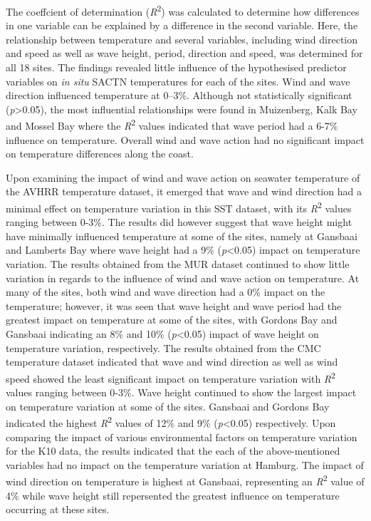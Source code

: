 \documentclass[12pt,a4paper,]{article}
\begin{document}
The coeffcient of determination (\emph{R}\textsuperscript{2}) was
calculated to determine how differences in one variable can be explained
by a difference in the second variable. Here, the relationship between
temperature and several variables, including wind direction and speed as
well as wave height, period, direction and speed, was determined for all
18 sites. The findings revealed little influence of the hypothesised
predictor variables on \emph{in situ} SACTN temperatures for each of the
sites. Wind and wave direction influenced temperature at 0--3\%.
Although not statistically significant (\emph{p}\textgreater{}0.05), the
most influential relationships were found in Muizenberg, Kalk Bay and
Mossel Bay where the \emph{R}\textsuperscript{2} values indicated that
wave period had a 6-7\% influence on temperature. Overall wind and wave
action had no significant impact on temperature differences along the
coast.

Upon examining the impact of wind and wave action on seawater
temperature of the AVHRR temperature dataset, it emerged that wave and
wind direction had a minimal effect on temperature variation in this SST
dataset, with its \emph{R}\textsuperscript{2} values ranging between
0-3\%. The results did however suggest that wave height might have
minimally influenced temperature at some of the sites, namely at
Gansbaai and Lamberts Bay where wave height had a 9\%
(\emph{p}\textless{}0.05) impact on temperature variation. The results
obtained from the MUR dataset continued to show little variation in
regards to the influence of wind and wave action on temperature. At many
of the sites, both wind and wave direction had a 0\% impact on the
temperature; however, it was seen that wave height and wave period had
the greatest impact on temperature at some of the sites, with Gordons
Bay and Gansbaai indicating an 8\% and 10\% (\emph{p}\textless{}0.05)
impact of wave height on temperature variation, respectively. The
results obtained from the CMC temperature dataset indicated that wave
and wind direction as well as wind speed showed the least significant
impact on temperature variation with \emph{R}\textsuperscript{2} values
ranging between 0-3\%. Wave height continued to show the largest impact
on temperature variation at some of the sites. Gansbaai and Gordons Bay
indicated the highest \emph{R}\textsuperscript{2} values of 12\% and 9\%
(\emph{p}\textless{}0.05) respectively. Upon comparing the impact of
various environmental factors on temperature variation for the K10 data,
the results indicated that the each of the above-mentioned variables had
no impact on the temperature variation at Hamburg. The impact of wind
direction on temperature is highest at Gansbaai, representing an
\emph{R}\textsuperscript{2} value of 4\% while wave height still
repersented the greatest influence on temperature occurring at these
sites.
\end{document}
